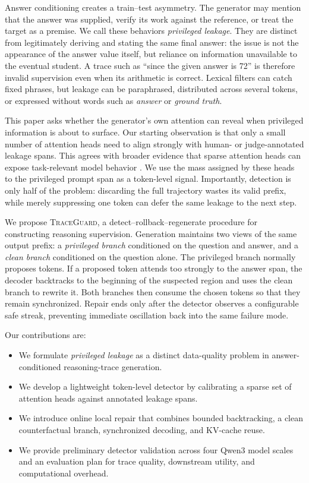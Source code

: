 \documentclass[11pt]{article}
\newcommand{\method}{\textsc{TraceGuard}\xspace}
\begin{document}
Answer conditioning creates a train--test asymmetry.  The generator may mention
that the answer was supplied, verify its work against the reference, or treat
the target as a premise.  We call these behaviors \emph{privileged leakage}.
They are distinct from legitimately deriving and stating the same final answer:
the issue is not the appearance of the answer value itself, but reliance on
information unavailable to the eventual student.  A trace such as ``since the
given answer is 72'' is therefore invalid supervision even when its arithmetic
is correct.  Lexical filters can catch fixed phrases, but leakage can be
paraphrased, distributed across several tokens, or expressed without words such
as \emph{answer} or \emph{ground truth}.

This paper asks whether the generator's own attention can reveal when
privileged information is about to surface.  Our starting observation is that
only a small number of attention heads need to align strongly with human- or
judge-annotated leakage spans.  This agrees with broader evidence that sparse
attention heads can expose task-relevant model behavior
\citep{hung2024attentiontracker}.  We use the mass assigned by these heads to
the privileged prompt span as a token-level signal.  Importantly, detection is
only half of the problem: discarding the full trajectory wastes its valid
prefix, while merely suppressing one token can defer the same leakage to the
next step.

We propose \method, a detect--rollback--regenerate procedure for constructing
reasoning supervision.  Generation maintains two views of the same output
prefix: a \emph{privileged branch} conditioned on the question and answer, and
a \emph{clean branch} conditioned on the question alone.  The privileged branch
normally proposes tokens.  If a proposed token attends too strongly to the
answer span, the decoder backtracks to the beginning of the suspected region
and uses the clean branch to rewrite it.  Both branches then consume the chosen
tokens so that they remain synchronized.  Repair ends only after the detector
observes a configurable safe streak, preventing immediate oscillation back into
the same failure mode.

Our contributions are:

\begin{itemize}
    \item We formulate \emph{privileged leakage} as a distinct data-quality
    problem in answer-conditioned reasoning-trace generation.
    \item We develop a lightweight token-level detector by calibrating a sparse
    set of attention heads against annotated leakage spans.
    \item We introduce online local repair that combines bounded backtracking,
    a clean counterfactual branch, synchronized decoding, and KV-cache reuse.
    \item We provide preliminary detector validation across four Qwen3 model
    scales and an evaluation plan for trace quality, downstream utility, and
    computational overhead.
\end{itemize}
\end{document}
